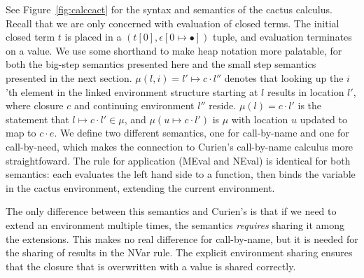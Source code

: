 See Figure~\ref{fig:calccact} for the syntax and semantics of the cactus
calculus. Recall that we are only concerned with evaluation of closed terms. The
initial closed term $t$ is placed in a $(t[0],\epsilon[0 \mapsto \bullet])$
tuple, and evaluation terminates on a value. We use some shorthand to make heap
notation more palatable, for both the big-step semantics presented here and the
small step semantics presented in the next section. $\mu(l,i)=l' \mapsto c
\cdot l''$ denotes that looking up the $i$'th element in the linked environment
structure starting at $l$ results in location $l'$, where closure $c$ and
continuing environment $l''$ reside. $\mu(l) = c \cdot l'$ is the statement
that $l \mapsto c \cdot l' \in \mu$, and $\mu(u \mapsto c \cdot l')$ is $\mu$
with location $u$ updated to map to $c \cdot e$. We define two different
semantics, one for call-by-name and one for call-by-need, which makes the
connection to Curien's call-by-name calculus more straightfoward. The rule for
application (MEval and NEval) is identical for both semantics: each evaluates
the left hand side to a function, then binds the variable in the cactus
environment, extending the current environment.

The only difference between this semantics and Curien's is that if we need
to extend an environment multiple times, the semantics \emph{requires}
sharing it among the extensions. This makes no real difference for call-by-name,
but it is needed for the sharing of results in the NVar rule. The explicit
environment sharing ensures that the closure that is overwritten with a value is
shared correctly.

